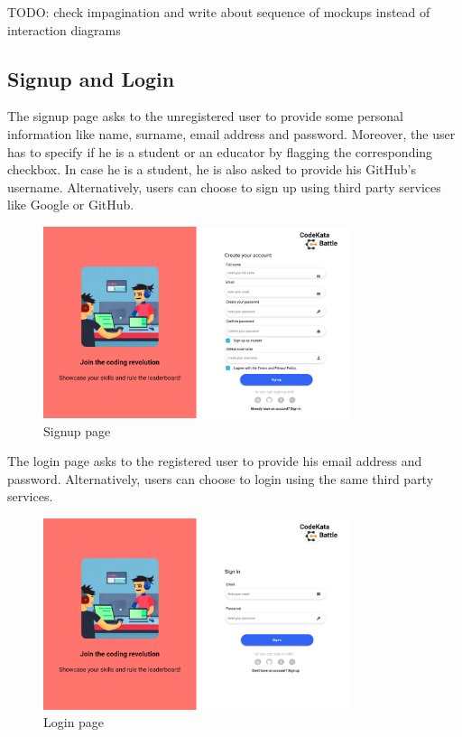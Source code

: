 TODO: check impagination and write about sequence of mockups instead of interaction diagrams
\subsection{Signup and Login}
The signup page asks to the unregistered user to provide some personal information like name, surname, email address and password. Moreover, the user has to specify if he is a student or an educator by flagging the corresponding checkbox. In case he is a student, he is also asked to provide his GitHub's username. Alternatively, users can choose to sign up using third party services like Google or GitHub.\\
\begin{figure}[H]
    \centering
    \includegraphics[width=0.8\textwidth]{Mockups/1_signup.png}
    \caption{Signup page}
\end{figure}
\newpage
The login page asks to the registered user to provide his email address and password. Alternatively, users can choose to login using the same third party services.\\
\begin{figure}[H]
    \centering
    \includegraphics[width=0.8\textwidth]{Mockups/2_login.png}
    \caption{Login page}
\end{figure}


